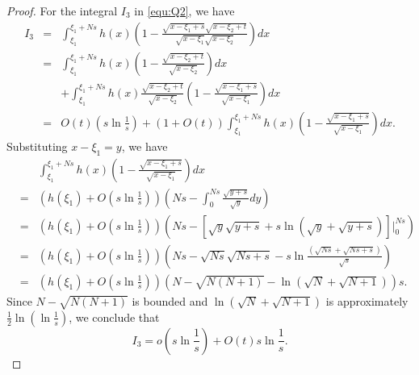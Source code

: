 \documentclass[11pt]{amsart}
\theoremstyle{plain}
\begin{document}
\begin{proof}
For the integral $I_3$ in \eqref{equ:Q2}, we have 
\begin{eqnarray*}
  I_3 &=& \int_{\xi_1}^{\xi_1+Ns} h(x)\left(1-\frac{\sqrt{x-\xi_1+s}\sqrt{x-\xi_2+t}}{\sqrt{x-\xi_1}\sqrt{x-\xi_2}}\right)dx
   \\
   &=& \int_{\xi_1}^{\xi_1+Ns} h(x) \left(1-\frac{\sqrt{x-\xi_2+t}}{\sqrt{x-\xi_2}}\right)dx \\
   && +\int_{\xi_1}^{\xi_1+Ns} h(x)\frac{\sqrt{x-\xi_2+t}}{\sqrt{x-\xi_2}}\left(1-\frac{\sqrt{x-\xi_1+s}}{\sqrt{x-\xi_1}}\right)dx \\
   &=& O(t) \left( s \ln \frac{1}{s}\right) + \left(1+O(t)\right)\int_{\xi_1}^{\xi_1+Ns} h(x)\left(1-\frac{\sqrt{x-\xi_1+s}}{\sqrt{x-\xi_1}}\right)dx.
\end{eqnarray*}
Substituting $x-\xi_1=y$, we have 
\begin{eqnarray*}
&& \int_{\xi_1}^{\xi_1+Ns}h(x) \left(1-\frac{\sqrt{x-\xi_1+s}}{\sqrt{x-\xi_1}}\right)dx \\
&=& \left( h(\xi_1)+O\left(s\ln\frac{1}{s}\right) \right) \left( Ns-\int_0^{Ns}\frac{\sqrt{y+s}}{\sqrt{y}}dy \right)\\
&=& \left( h(\xi_1)+O\left(s\ln\frac{1}{s}\right) \right) \left( Ns-\left[\sqrt{y}\sqrt{y+s}+s\ln(\sqrt{y}+\sqrt{y+s})\right]|_0^{Ns} \right)\\
&=&  \left( h(\xi_1)+O\left(s\ln\frac{1}{s}\right) \right) \left( Ns-\sqrt{Ns}\sqrt{Ns+s}-s\ln\frac{(\sqrt{Ns}+\sqrt{Ns+s})}{\sqrt{s}} \right)\\
&=& \left( h(\xi_1)+O\left(s\ln\frac{1}{s}\right) \right) \left(N-\sqrt{N(N+1)}-\ln(\sqrt{N}+\sqrt{N+1})\right)s.
\end{eqnarray*}
Since $N-\sqrt{N(N+1)}$ is bounded and $\ln(\sqrt{N}+\sqrt{N+1})$ is approximately 
$\frac{1}{2} \ln \left(\ln \frac{1}{s}\right)$,
we conclude that  $$I_3= o\left(s \ln \frac{1}{s}\right)+ O(t) s \ln \frac{1}{s}.$$ 




\end{proof}
\end{document}
